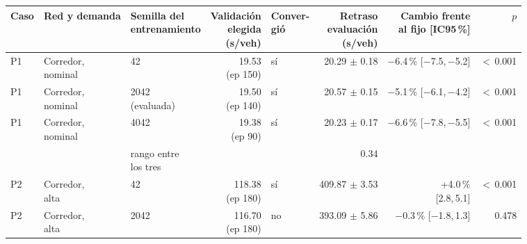 \begin{table}[H]
\centering
\scriptsize
\setlength{\tabcolsep}{3pt}
\begin{tabular}{lllrlrrr}
\toprule
Caso & Red y demanda & \makecell{Semilla del\\entrenamiento} & \makecell{Validación\\elegida\\(s/veh)} & \makecell{Conver-\\gió} & \makecell{Retraso\\evaluación\\(s/veh)} & \makecell{Cambio frente\\al fijo [IC95\,\%]} & $p$ \\
\midrule
P1 & \makecell[l]{Corredor,\\{}nominal} & 42 & \makecell[r]{19.53\\{}(ep 150)} & sí & \makecell[r]{20.29\\{}$\pm$ 0.18} & \makecell[r]{$-$6.4\,\%\\{}[$-$7.5,\,$-$5.2]} & $<$\,0.001 \\
P1 & \makecell[l]{Corredor,\\{}nominal} & \makecell[l]{2042\\{}(evaluada)} & \makecell[r]{19.50\\{}(ep 140)} & sí & \makecell[r]{20.57\\{}$\pm$ 0.15} & \makecell[r]{$-$5.1\,\%\\{}[$-$6.1,\,$-$4.2]} & $<$\,0.001 \\
P1 & \makecell[l]{Corredor,\\{}nominal} & 4042 & \makecell[r]{19.38\\{}(ep 90)} & sí & \makecell[r]{20.23\\{}$\pm$ 0.17} & \makecell[r]{$-$6.6\,\%\\{}[$-$7.8,\,$-$5.5]} & $<$\,0.001 \\
 & & \makecell[l]{rango entre\\{}los tres} & & & 0.34 & & \\
P2 & \makecell[l]{Corredor,\\{}alta} & 42 & \makecell[r]{118.38\\{}(ep 180)} & sí & \makecell[r]{409.87\\{}$\pm$ 3.53} & \makecell[r]{+4.0\,\%\\{}[2.8,\,5.1]} & $<$\,0.001 \\
P2 & \makecell[l]{Corredor,\\{}alta} & 2042 & \makecell[r]{116.70\\{}(ep 180)} & no & \makecell[r]{393.09\\{}$\pm$ 5.86} & \makecell[r]{$-$0.3\,\%\\{}[$-$1.8,\,1.3]} & 0.478 \\

\end{tabular}
\end{table}
